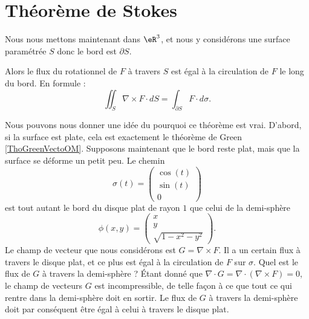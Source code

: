 \section{Théorème de Stokes}

Nous nous mettons maintenant dans $\eR^3$, et nous y considérons une surface paramétrée $S$ donc le bord est $\partial S$. 

\begin{theorem}
    Alors le flux du rotationnel de $F$ à travers $S$ est égal à la circulation de $F$ le long du bord. En formule :
    \begin{equation}
        \iint_S\nabla\times F\cdot dS=\int_{\partial S} F\cdot d\sigma.
    \end{equation}
\end{theorem}

Nous pouvons nous donner une idée du pourquoi ce théorème est vrai. D'abord, si la surface est plate, cela est exactement le théorème de Green \ref{ThoGreenVectoOM}. Supposons maintenant que le bord reste plat, mais que la surface se déforme un petit peu. Le chemin
\begin{equation}
    \sigma(t)=\begin{pmatrix}
        \cos(t)    \\ 
        \sin(t)    \\ 
        0    
    \end{pmatrix}
\end{equation}
est tout autant le bord du disque plat de rayon $1$ que celui de la demi-sphère
\begin{equation}
    \phi(x,y)=\begin{pmatrix}
        x    \\ 
        y    \\ 
        \sqrt{1-x^2-y^2}    
    \end{pmatrix}.
\end{equation}
Le champ de vecteur que nous considérons est $G=\nabla\times F$. Il a un certain flux à travers le disque plat, et ce plus est égal à la circulation de $F$ sur $\sigma$. Quel est le flux de $G$ à travers la demi-sphère ? Étant donné que $\nabla\cdot G=\nabla\cdot(\nabla\times F)=0$, le champ de vecteurs $G$ est incompressible, de telle façon à ce que tout ce qui rentre dans la demi-sphère doit en sortir. Le flux de $G$ à travers la demi-sphère doit par conséquent être égal à celui à travers le disque plat.


